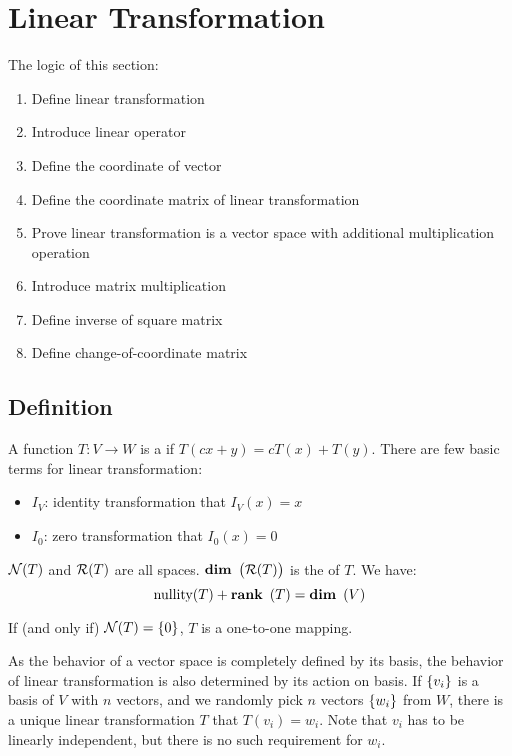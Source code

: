 
\chapter{Linear Transformation}

The logic of this section:
\begin{enumerate}
    \item Define linear transformation
    \item Introduce linear operator
    \item Define the coordinate of vector
    \item Define the coordinate matrix of linear transformation
    \item Prove linear transformation is a vector space with additional multiplication operation
    \item Introduce matrix multiplication
    \item Define inverse of square matrix
    \item Define change-of-coordinate matrix
\end{enumerate}

\section{Definition}
A function $T:V \rightarrow W$ is a  if $T(cx + y) = cT(x) + T(y)$. There are few basic terms for linear transformation:
\begin{itemize}
    \item $I_V$: identity transformation that $I_V (x) = x$
    \item $I_0$: zero transformation that $I_0 (x) = 0$
\end{itemize}

$\mathcal{N}(T)$ and $\mathcal{R}(T)$ are all spaces. $\displaystyle \mathop{\bf dim\/}~\left( \mathcal{R}(T) \right)$ is the  of $T$. We have:
\begin{equation}
    \text{nullity}(T) + \displaystyle \mathop{\bf rank\/}~\left( T \right) = \displaystyle \mathop{\bf dim\/}~\left( V \right)
\end{equation}

If (and only if) $\mathcal{N}(T) = \set{0}$, $T$ is a one-to-one mapping.


\begin{theorem}
    As the behavior of a vector space is completely defined by its basis, the behavior of linear transformation is also determined by its action on basis. If $\set{v_i}$ is a basis of $V$ with $n$ vectors, and we randomly pick $n$ vectors $\set{w_i}$ from $W$, there is a unique linear transformation $T$ that $T(v_i) = w_i$. Note that $v_i$ has to be linearly independent, but there is no such requirement for $w_i$.
\end{theorem}



